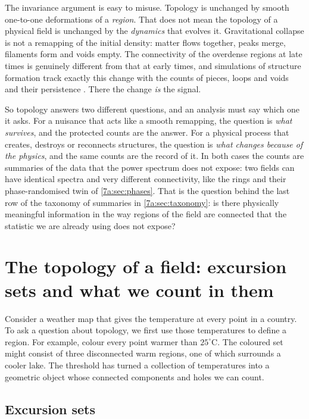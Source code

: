 The invariance argument is easy to misuse. Topology is unchanged by smooth one-to-one deformations of a
\emph{region}. That does not mean the topology of a physical field is unchanged by the \emph{dynamics} that
evolves it. Gravitational collapse is not a remapping of the initial density: matter flows together, peaks
merge, filaments form and voids empty. The connectivity of the overdense regions at late times is genuinely
different from that at early times, and simulations of structure formation track exactly this change with
the counts of pieces, loops and voids and their persistence \cite{Pranav2017,Wilding2021}. There the change
\emph{is} the signal.

So topology answers two different questions, and an analysis must say which one it asks. For a nuisance
that acts like a smooth remapping, the question is \emph{what survives}, and the protected counts are the
answer. For a physical process that creates, destroys or reconnects structures, the question is \emph{what
changes because of the physics}, and the same counts are the record of it. In both cases the counts are
summaries of the data that the power spectrum does not expose: two fields can have identical spectra and
very different connectivity, like the rings and their phase-randomised twin of \cref{7a:sec:phases}. That
is the question behind the last row of the taxonomy of summaries in \cref{7a:sec:taxonomy}: is there
physically meaningful information in the way regions of the field are connected that the statistic we are
already using does not expose?
\section{The topology of a field: excursion sets and what we count in them}
\label{12a:sec:excursion}

Consider a weather map that gives the temperature at every point in a country.
To ask a question about topology, we first use those temperatures to define a region.
For example, colour every point warmer than $25^\circ$C. The coloured set might
consist of three disconnected warm regions, one of which surrounds a cooler lake.
The threshold has turned a collection of temperatures into a geometric object whose
connected components and holes we can count.

\subsection{Excursion sets}
\label{12a:sec:xnu}

